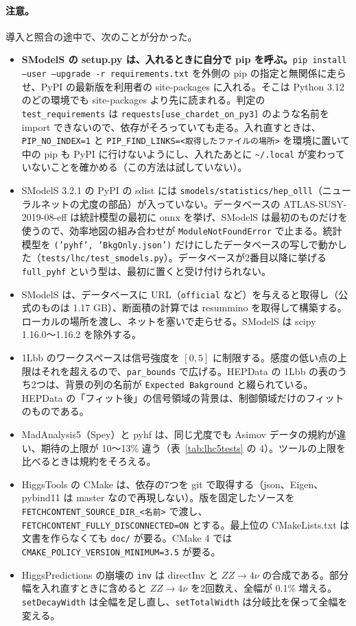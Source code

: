 \documentclass[a4paper,10pt]{ltjsarticle}
\newcommand{\pth}[1]{\texttt{\textasciitilde/}\nolinkurl{#1}}
\begin{document}
\paragraph{注意。}導入と照合の途中で、次のことが分かった。
\begin{itemize}
\item \textbf{SModelS の setup.py は、入れるときに自分で pip を呼ぶ。}\texttt{pip install --user --upgrade -r requirements.txt} を外側の pip の指定と無関係に走らせ、PyPI の最新版を利用者の site-packages に入れる。そこは Python 3.12 のどの環境でも site-packages より先に読まれる。判定の \texttt{test\_requirements} は \texttt{requests[use\_chardet\_on\_py3]} のような名前を import できないので、依存がそろっていても走る。入れ直すときは、\texttt{PIP\_NO\_INDEX=1} と \texttt{PIP\_FIND\_LINKS=<取得したファイルの場所>} を環境に置いて中の pip も PyPI に行けないようにし、入れたあとに \pth{.local} が変わっていないことを確かめる（この方法は試していない）。
\item SModelS 3.2.1 の PyPI の sdist には \texttt{smodels/statistics/hep\_olll}（ニューラルネットの尤度の部品）が入っていない。データベースの ATLAS-SUSY-2019-08-eff は統計模型の最初に onnx を挙げ、SModelS は最初のものだけを使うので、効率地図の組み合わせが \texttt{ModuleNotFoundError} で止まる。統計模型を \texttt{('pyhf', 'BkgOnly.json')} だけにしたデータベースの写しで動かした（\nolinkurl{tests/lhc/test_smodels.py}）。データベースが2番目以降に挙げる \texttt{full\_pyhf} という型は、最初に置くと受け付けられない。
\item SModelS は、データベースに URL（\texttt{official} など）を与えると取得し（公式のものは 1.17 GB）、断面積の計算では resummino を取得して構築する。ローカルの場所を渡し、ネットを塞いで走らせる。SModelS は scipy 1.16.0〜1.16.2 を除外する。
\item 1Lbb のワークスペースは信号強度を $[0,5]$ に制限する。感度の低い点の上限はそれを超えるので、\texttt{par\_bounds} で広げる。HEPData の 1Lbb の表のうち2つは、背景の列の名前が \texttt{Expected Bakground} と綴られている。HEPData の「フィット後」の信号領域の背景は、制御領域だけのフィットのものである。
\item MadAnalysis5（Spey）と pyhf は、同じ尤度でも Asimov データの規約が違い、期待の上限が 10〜13\% 違う（表~\ref{tab:lhc5tests} の 4）。ツールの上限を比べるときは規約をそろえる。
\item HiggsTools の CMake は、依存の7つを git で取得する（json、Eigen、pybind11 は master なので再現しない）。版を固定したソースを \texttt{FETCHCONTENT\_}\allowbreak\texttt{SOURCE\_DIR\_<名前>} で渡し、\texttt{FETCHCONTENT\_}\allowbreak\texttt{FULLY\_DISCONNECTED=ON} とする。最上位の CMakeLists.txt は文書を作らなくても \texttt{doc/} が要る。CMake 4 では \texttt{CMAKE\_POLICY\_}\allowbreak\texttt{VERSION\_MINIMUM=3.5} が要る。
\item HiggsPredictions の崩壊の \texttt{inv} は directInv と $ZZ\to4\nu$ の合成である。部分幅を入れ直すときに含めると $ZZ\to4\nu$ を2回数え、全幅が 0.1\% 増える。\texttt{setDecayWidth} は全幅を足し直し、\texttt{setTotalWidth} は分岐比を保って全幅を変える。
\end{itemize}
\end{document}
